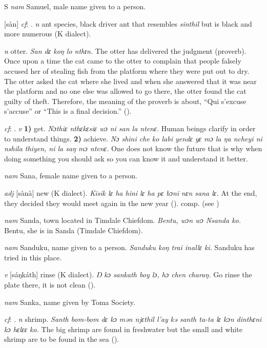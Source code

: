 \begin{letter}{S}
 \textit{nam} Samuel, male name given to a person.

 [sàn] \textit{cf}: . \textit{n} ant species, black driver ant that resembles \textit{sinthil} but is black and more numerous (K dialect). 

 \textit{n} otter. \textit{San dɛ koŋ lo nthɪn.} The otter has delivered the judgment (proverb). Once upon a time the cat came to the otter to complain that people falsely accused her of stealing fish from the platform where they were put out to dry. The otter asked the cat where she lived and when she answered that it was near the platform and no one else was allowed to go there, the otter found the cat guilty of theft. Therefore, the meaning of the proverb is about, “Qui s'excuse s'accuse” or “This is a final decision.” (\citealt{Pichl1967}). 

 \textit{cf}: . \textit{v} \textbf{1)} get. \textit{Nɔthiɛ nthɛkɛsiɛ wɔ ni san la ntenɛ.} Human beings clarify in order to understand things. \textbf{2)} achieve. \textit{Nɔ shini che ko labi yendɛ yɛ mɔ la ŋa ncheyi ni nshila thiyen, ni la saŋ mɔ ntenɛ.} One does not know the future that is why when doing something you should ask so you can know it and understand it better.

 \textit{nam} Sana, female name given to a person.

 \textit{adj} [sànà] new (K dialect). \textit{Kisik lɛ ha hini lɛ ha pɛ bɔni nɛn sana lɛ.} At the end, they decided they would meet again in the new year (\citealt{Pichl1967}). comp.  (see ) 

 \textit{nam} Sanda, town located in Timdale Chiefdom. \textit{Bentu, wɔn wɔ Nsanda ko.} Bentu, she is in Sanda (Timdale Chiefdom).

 \textit{nam} Sanduku, name given to a person. \textit{Sanduku koŋ trai inallɛ ki.} Sanduku has tried in this place.

 \textit{v} [sáŋkáth] rinse (K dialect). \textit{Ŋ kɔ sankath boy lɔ, hɔ chen charaŋ.} Go rinse the plate there, it is not clean (\citealt{Pichl1967}). 

 \textit{nam} Sanka, name given by Toma Society. 

 \textit{cf}: . \textit{n} shrimp. \textit{Santh bom-bom dɛ kɔ mən njɛthil l'ay kə santh ta-ta lɛ kɔn dinthɛni kɔ hɛlɛɛ ko.} The big shrimp are found in freshwater but the small and white shrimp are to be found in the sea (\citealt{Pichl1967}). 


\end{letter}
